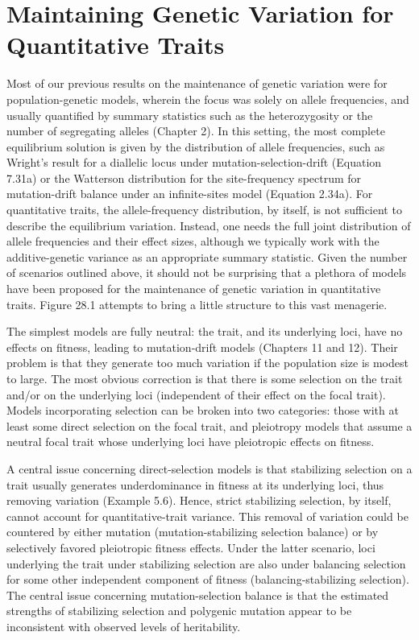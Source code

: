 \documentclass{article}
\begin{document}
\section{Maintaining Genetic Variation for Quantitative Traits}
Most of our previous results on the maintenance of genetic variation were for population-genetic models, wherein the focus was solely on allele frequencies, and usually quantified by summary statistics such as the heterozygosity or the number of segregating alleles (Chapter 2). In this setting, the most complete equilibrium solution is given by the distribution of allele frequencies, such as Wright's result for a diallelic locus under mutation-selection-drift (Equation 7.31a) or the Watterson distribution for the site-frequency spectrum for mutation-drift balance under an infinite-sites model (Equation 2.34a). For quantitative traits, the allele-frequency distribution, by itself, is not sufficient to describe the equilibrium variation. Instead, one needs the full joint distribution of allele frequencies and their effect sizes, although we typically work with the additive-genetic variance as an appropriate summary statistic. Given the number of scenarios outlined above, it should not be surprising that a plethora of models have been proposed for the maintenance of genetic variation in quantitative traits. Figure 28.1 attempts to bring a little structure to this vast menagerie.

The simplest models are fully neutral: the trait, and its underlying loci, have no effects on fitness, leading to mutation-drift models (Chapters 11 and 12). Their problem is that they generate too much variation if the population size is modest to large. The most obvious correction is that there is some selection on the trait and/or on the underlying loci (independent of their effect on the focal trait). Models incorporating selection can be broken into two categories: those with at least some direct selection on the focal trait, and pleiotropy models that assume a neutral focal trait whose underlying loci have pleiotropic effects on fitness.

A central issue concerning direct-selection models is that stabilizing selection on a trait usually generates underdominance in fitness at its underlying loci, thus removing variation (Example 5.6). Hence, strict stabilizing selection, by itself, cannot account for quantitative-trait variance. This removal of variation could be countered by either mutation (mutation-stabilizing selection balance) or by selectively favored pleiotropic fitness effects. Under the latter scenario, loci underlying the trait under stabilizing selection are also under balancing selection for some other independent component of fitness (balancing-stabilizing selection). The central issue concerning mutation-selection balance is that the estimated strengths of stabilizing selection and polygenic mutation appear to be inconsistent with observed levels of heritability.
\end{document}
